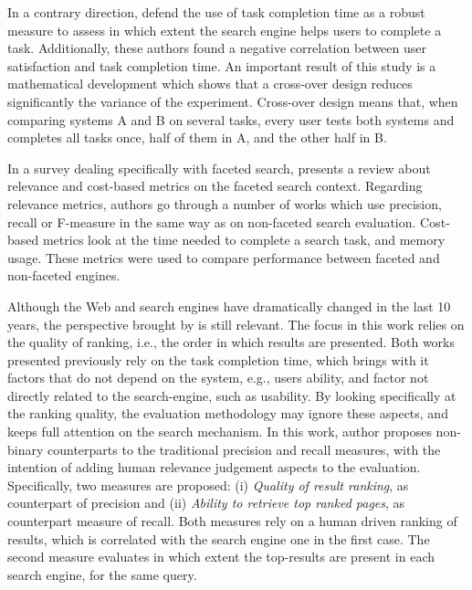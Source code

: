 In a contrary direction,  defend the use of task completion time as a robust measure to assess in which extent the search engine helps users to complete a task.
Additionally, these authors found a negative correlation between user satisfaction and task completion time.
An important result of this study is a mathematical development which shows that a cross-over design reduces significantly the variance of the experiment.
Cross-over design means that, when comparing systems A and B on several tasks, every user tests both systems and completes all tasks once, half of them in A, and the other half in B.


In a survey dealing specifically with faceted search,  presents a review about relevance and cost-based metrics on the faceted search context.
Regarding relevance metrics, authors go through a number of works which use precision, recall or F-measure in the same way as on non-faceted search evaluation.
Cost-based metrics look at the time needed to complete a search task, and memory usage.
These metrics were used to compare performance between faceted and non-faceted engines.

Although the Web and search engines have dramatically changed in the last 10 years, the perspective brought by  is still relevant.
The focus in this work relies on the quality of ranking, i.e., the order in which results are presented.
Both works presented previously rely on the task completion time, which brings with it factors that do not depend on the system, e.g., users ability, and factor not directly related to the search-engine, such as usability.
By looking specifically at the ranking quality, the evaluation methodology may ignore these aspects, and keeps full attention on the search mechanism.
In this work, author proposes non-binary counterparts to the traditional precision and recall measures, with the intention of adding human relevance judgement aspects to the evaluation.
Specifically, two measures are proposed: (i) \emph{Quality of result ranking}, as counterpart of precision and (ii) \emph{Ability to retrieve top ranked pages}, as counterpart measure of recall.
Both measures rely on a human driven ranking of results, which is correlated with the search engine one in the first case.
The second measure evaluates in which extent the top-results are present in each search engine, for the same query.

